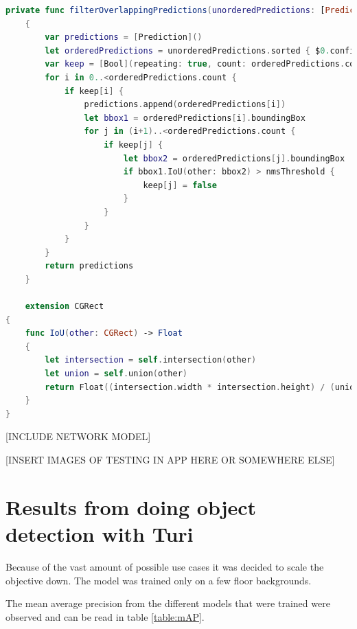 \begin{lstlisting}[language=swift]
    private func filterOverlappingPredictions(unorderedPredictions: [Prediction], nmsThreshold: Float) -> [Prediction]
    {
        var predictions = [Prediction]()
        let orderedPredictions = unorderedPredictions.sorted { $0.confidence > $1.confidence }
        var keep = [Bool](repeating: true, count: orderedPredictions.count)
        for i in 0..<orderedPredictions.count {
            if keep[i] {
                predictions.append(orderedPredictions[i])
                let bbox1 = orderedPredictions[i].boundingBox
                for j in (i+1)..<orderedPredictions.count {
                    if keep[j] {
                        let bbox2 = orderedPredictions[j].boundingBox
                        if bbox1.IoU(other: bbox2) > nmsThreshold {
                            keep[j] = false
                        }
                    }
                }
            }
        }
        return predictions
    }
    
    extension CGRect
{
    func IoU(other: CGRect) -> Float
    {
        let intersection = self.intersection(other)
        let union = self.union(other)
        return Float((intersection.width * intersection.height) / (union.width * union.height))
    }
}
\end{lstlisting}



[INCLUDE NETWORK MODEL]

 [INSERT IMAGES OF TESTING IN APP HERE  OR SOMEWHERE ELSE] 



\section{Results from doing object detection with Turi}
\label{sec:turiResults}
Because of the vast amount of possible use cases it was decided to scale the objective down. The model was trained only on a few floor backgrounds. 

The mean average precision from the different models that were trained were observed and can be read in table \ref{table:mAP}. 

